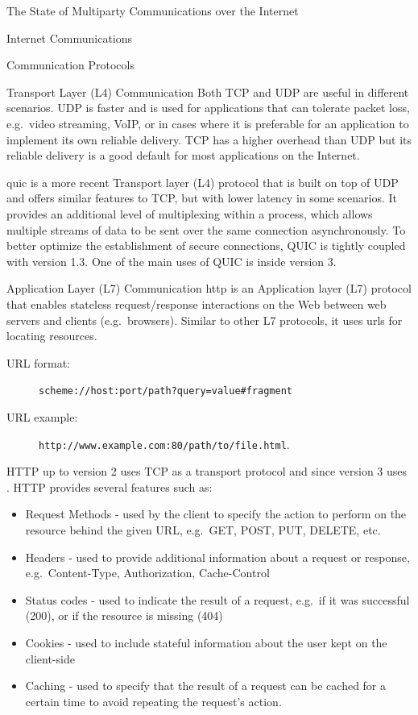 \begin{frame}[fragile]{The State of Multiparty Communications over the
Internet}
\begin{block}{Internet Communications}
\begin{block}{Communication Protocols}
\begin{block}{Transport Layer (L4) Communication}
Both TCP and UDP are useful in different scenarios. UDP is faster and is
used for applications that can tolerate packet loss, e.g.~video
streaming, VoIP, or in cases where it is preferable for an application
to implement its own reliable delivery. TCP has a higher overhead than
UDP but its reliable delivery is a good default for most applications on
the Internet.

\gls{quic} is a more recent Transport layer (L4) protocol that is built
on top of UDP and offers similar features to TCP, but with lower latency
in some scenarios. It provides an additional level of multiplexing
within a process, which allows multiple streams of data to be sent over
the same connection asynchronously. To better optimize the establishment
of secure connections, QUIC is tightly coupled with  version
1.3. One of the main uses of QUIC is inside  version 3.
\end{block}

\begin{block}{Application Layer (L7) Communication}
\protect\hypertarget{application-layer-l7-communication}{}
\gls{http} is an Application layer (L7) protocol that enables stateless
request/response interactions on the Web between web servers and clients
(e.g.~browsers). Similar to other L7 protocols, it uses \glspl{url} for
locating resources.

\begin{description}
\item[URL format:]
\texttt{scheme://host:port/path?query=value\#fragment}
\item[URL example:]
\texttt{http://www.example.com:80/path/to/file.html}.
\end{description}

HTTP up to version 2 uses TCP as a transport protocol and since version
3 uses . HTTP provides several features such as:

\begin{itemize}
\tightlist
\item
  Request Methods - used by the client to specify the action to perform
  on the resource behind the given URL, e.g.~GET, POST, PUT, DELETE,
  etc.
\item
  Headers - used to provide additional information about a request or
  response, e.g.~Content-Type, Authorization, Cache-Control
\item
  Status codes - used to indicate the result of a request, e.g.~if it
  was successful (200), or if the resource is missing (404)
\item
  Cookies - used to include stateful information about the user kept on
  the client-side
\item
  Caching - used to specify that the result of a request can be cached
  for a certain time to avoid repeating the request's action.
\end{itemize}


\end{block}
\end{block}
\end{block}
\end{frame}
